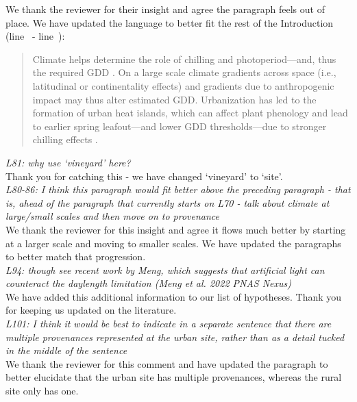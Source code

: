\documentclass[11pt,a4paper]{article}\usepackage[]{graphicx}\usepackage[]{color}
\newcommand{\lr}[1]{line~\lineref{#1}}
\begin{document}
We thank the reviewer for their insight and agree the paragraph feels out of place. We have updated the language to better fit the rest of the Introduction (\lr{Z4urban} - \lr{Z4urbanend}): \\

\begin{quotation} 
\noindent Climate helps determine the role of chilling and photoperiod---and, thus the required GDD \citep{Bonhomme2000}. On a large scale climate gradients across space (i.e., latitudinal or continentality effects) and gradients due to anthropogenic impact may thus alter estimated GDD. Urbanization has led to the formation of urban heat islands, which can affect plant phenology and lead to earlier spring leafout---and lower GDD thresholds---due to stronger chilling effects \citep{Meng2020}.
\end{quotation}

\textit{L81: why use `vineyard' here?} \\

Thank you for catching this - we have changed `vineyard' to `site'. \\

\textit{L80-86: I think this paragraph would fit better above the preceding paragraph - that is, ahead of the paragraph that currently starts on L70 - talk about climate at large/small scales and then move on to provenance} \\

We thank the reviewer for this insight and agree it flows much better by starting at a larger scale and moving to smaller scales. We have updated the paragraphs to better match that progression. \\

\textit{L94: though see recent work by Meng, which suggests that artificial light can counteract the daylength limitation (Meng et al. 2022 PNAS Nexus)} \\

We have added this additional information to our list of hypotheses. Thank you for keeping us updated on the literature. \\

\textit{L101: I think it would be best to indicate in a separate sentence that there are multiple provenances represented at the urban site, rather than as a detail tucked in the middle of the sentence} \\

We thank the reviewer for this comment and have updated the paragraph to better elucidate that the urban site has multiple provenances, whereas the rural site only has one. \\
\end{document}
